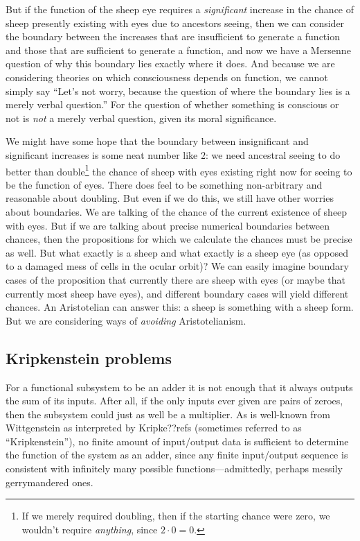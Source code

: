 But if the function of the sheep eye requires a \textit{significant} increase in the chance of sheep presently existing 
with eyes due to ancestors seeing, then we can consider the boundary between the increases that are insufficient to generate a function and those that 
are sufficient to generate a function, and now we have a Mersenne question of why this boundary lies exactly where it does. And because
we are considering theories on which consciousness depends on function, we cannot simply say ``Let's not worry, because the 
question of where the boundary lies is a merely verbal question.'' For the question of whether something is conscious or not 
is \textit{not} a merely verbal question, given its moral significance.

We might have some hope that the boundary between insignificant and significant increases is some neat number like $2$: we 
need ancestral seeing to do better than double\footnote{If we merely required doubling, then if the starting chance were 
zero, we wouldn't require \textit{anything}, since $2\cdot 0=0$.} the chance of sheep with eyes existing right now for 
seeing to be the function of eyes. There does feel to be something non-arbitrary and reasonable about doubling. But even 
if we do this, we still have other worries about boundaries. We are talking of the chance of the current existence of sheep 
with eyes. But if we are talking about precise numerical boundaries between chances, then the propositions for which we 
calculate the chances must be precise as well. But what exactly is a sheep and what exactly is a sheep eye (as opposed to 
a damaged mess of cells in the ocular orbit)? We can easily 
imagine boundary cases of the proposition that currently there are sheep with eyes (or maybe that currently most sheep have
eyes), and different boundary cases will yield different chances. An Aristotelian can answer this: a sheep is something
with a sheep form. But we are considering ways of \textit{avoiding} Aristotelianism.

\subsection{Kripkenstein problems}
For a functional subsystem to be an adder it is not enough that it always outputs the sum of its inputs. 
After all, if the only inputs ever
given are pairs of zeroes, then the subsystem could just as well be a multiplier. As is well-known from Wittgenstein as interpreted by Kripke??refs (sometimes referred to as ``Kripkenstein''),
no finite amount of input/output data is sufficient to determine the function of the system as an adder, since any 
finite input/output sequence is consistent with infinitely many possible functions---admittedly, perhaps messily gerrymandered ones.

